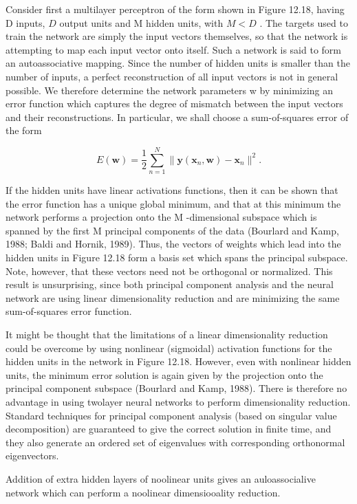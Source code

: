 \documentclass[
  10
]{article}
\begin{document}
Consider first a multilayer perceptron of the form shown in Figure
12.18, having D inputs, \(D\) output units and M hidden units, with
\(M < D\) . The targets used to train the network are simply the input
vectors themselves, so that the network is attempting to map each input
vector onto itself. Such a network is said to form an autoassociative
mapping. Since the number of hidden units is smaller than the number of
inputs, a perfect reconstruction of all input vectors is not in general
possible. We therefore determine the network parameters w by minimizing
an error function which captures the degree of mismatch between the
input vectors and their reconstructions. In particular, we shall choose
a sum-of-squares error of the form

\[
E (\mathbf {w}) = \frac {1}{2} \sum_ {n = 1} ^ {N} \| \mathbf {y} (\mathbf {x} _ {n}, \mathbf {w}) - \mathbf {x} _ {n} \| ^ {2}.\tag{12.91}
\]

If the hidden units have linear activations functions, then it can be
shown that the error function has a unique global minimum, and that at
this minimum the network performs a projection onto the M -dimensional
subspace which is spanned by the first M principal components of the
data (Bourlard and Kamp, 1988; Baldi and Hornik, 1989). Thus, the
vectors of weights which lead into the hidden units in Figure 12.18 form
a basis set which spans the principal subspace. Note, however, that
these vectors need not be orthogonal or normalized. This result is
unsurprising, since both principal component analysis and the neural
network are using linear dimensionality reduction and are minimizing the
same sum-of-squares error function.

It might be thought that the limitations of a linear dimensionality
reduction could be overcome by using nonlinear (sigmoidal) activation
functions for the hidden units in the network in Figure 12.18. However,
even with nonlinear hidden units, the minimum error solution is again
given by the projection onto the principal component subspace (Bourlard
and Kamp, 1988). There is therefore no advantage in using twolayer
neural networks to perform dimensionality reduction. Standard techniques
for principal component analysis (based on singular value decomposition)
are guaranteed to give the correct solution in finite time, and they
also generate an ordered set of eigenvalues with corresponding
orthonormal eigenvectors.

Addition of extra hidden layers of noolinear units gives an
auloassocialive network which can perform a noolinear dimensiooality
reduction.
\end{document}
